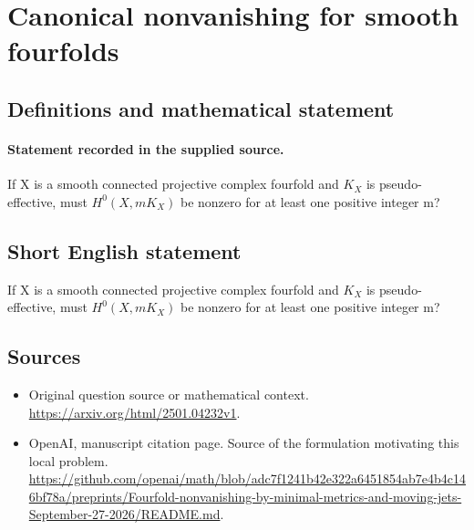 \documentclass[11pt]{article}
\begin{document}
\section*{Canonical nonvanishing for smooth fourfolds}\label{30007020}
\subsection{Definitions and mathematical statement}
\paragraph{Statement recorded in the supplied source.}
If X is a smooth connected projective complex fourfold and $K_X$ is pseudo-effective, must $H^{0}(X,mK_X)$ be nonzero for at least one positive integer m?
\subsection{Short English statement}
If X is a smooth connected projective complex fourfold and $K_X$ is pseudo-effective, must $H^{0}(X,mK_X)$ be nonzero for at least one positive integer m?
\subsection{Sources}
\begin{itemize}
\item[S1] Original question source or mathematical context.
\url{https://arxiv.org/html/2501.04232v1}.
\item[S2] OpenAI, manuscript citation page. Source of the formulation motivating this local problem.
\url{https://github.com/openai/math/blob/adc7f1241b42e322a6451854ab7e4b4c146bf78a/preprints/Fourfold-nonvanishing-by-minimal-metrics-and-moving-jets-September-27-2026/README.md}.
\end{itemize}
\end{document}
